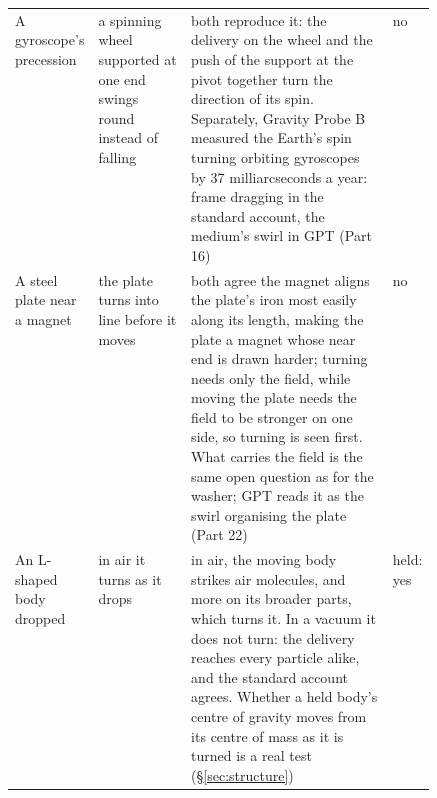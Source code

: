 \begin{table}[p]
\begin{tabularx}{\linewidth}{@{}>{\raggedright\arraybackslash}p{0.18\linewidth} >{\raggedright\arraybackslash}p{0.22\linewidth} >{\raggedright\arraybackslash}X >{\raggedright\arraybackslash}p{0.09\linewidth}@{}}
A gyroscope's precession & a spinning wheel supported at one end swings round instead of falling & both reproduce it: the delivery on the wheel and the push of the support at the pivot together turn the direction of its spin. Separately, Gravity Probe B measured the Earth's spin turning orbiting gyroscopes by 37 milliarcseconds a year: frame dragging in the standard account, the medium's swirl in GPT (Part 16) & no\\
A steel plate near a magnet & the plate turns into line before it moves & both agree the magnet aligns the plate's iron most easily along its length, making the plate a magnet whose near end is drawn harder; turning needs only the field, while moving the plate needs the field to be stronger on one side, so turning is seen first. What carries the field is the same open question as for the washer; GPT reads it as the swirl organising the plate (Part 22) & no\\
An L-shaped body dropped & in air it turns as it drops & in air, the moving body strikes air molecules, and more on its broader parts, which turns it. In a vacuum it does not turn: the delivery reaches every particle alike, and the standard account agrees. Whether a held body's centre of gravity moves from its centre of mass as it is turned is a real test (§\ref{sec:structure}) & held: yes\\
\bottomrule
\end{tabularx}\label{tab:demos}\end{table}

